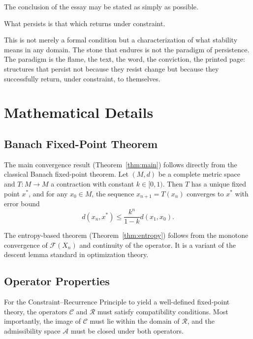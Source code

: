 \documentclass[12pt, oneside]{article}
\theoremstyle{definition}
\theoremstyle{remark}
\begin{document}
The conclusion of the essay may be stated as simply as possible.

\begin{quoting}
What persists is that which returns under constraint.
\end{quoting}

This is not merely a formal condition but a characterization of what stability means in any domain.
The stone that endures is not the paradigm of persistence.
The paradigm is the flame, the text, the word, the conviction, the printed page: structures that persist not because they resist change but because they successfully return, under constraint, to themselves.

\appendix

\section{Mathematical Details}

\subsection{Banach Fixed-Point Theorem}

The main convergence result (Theorem~\ref{thm:main}) follows directly from the classical Banach fixed-point theorem.
Let $(M, d)$ be a complete metric space and $T: M \to M$ a contraction with constant $k \in [0, 1)$.
Then $T$ has a unique fixed point $x^{*}$, and for any $x_{0} \in M$, the sequence $x_{n+1} = T(x_{n})$ converges to $x^{*}$ with error bound
\[
d(x_{n}, x^{*}) \leq \frac{k^{n}}{1-k} d(x_{1}, x_{0}).
\]

The entropy-based theorem (Theorem~\ref{thm:entropy}) follows from the monotone convergence of $\mathcal{F}(X_{n})$ and continuity of the operator.
It is a variant of the descent lemma standard in optimization theory.

\subsection{Operator Properties}

For the Constraint--Recurrence Principle to yield a well-defined fixed-point theory, the operators $\mathcal{C}$ and $\mathcal{R}$ must satisfy compatibility conditions.
Most importantly, the image of $\mathcal{C}$ must lie within the domain of $\mathcal{R}$, and the admissibility space $\mathcal{A}$ must be closed under both operators.
\end{document}
